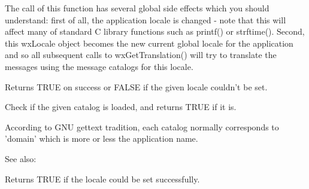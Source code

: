 

The call of this function has several global side effects which you should
understand: first of all, the application locale is changed - note that this
will affect many of standard C library functions such as printf() or strftime().
Second, this wxLocale object becomes the new current global locale for the
application and so all subsequent calls to wxGetTranslation() will try to
translate the messages using the message catalogs for this locale.

Returns TRUE on success or FALSE if the given locale couldn't be set.

\label{wxlocaleisloaded}


Check if the given catalog is loaded, and returns TRUE if it is.

According to GNU gettext tradition, each catalog
normally corresponds to 'domain' which is more or less the application name.

See also: 

\label{wxlocaleisok}


Returns TRUE if the locale could be set successfully.


